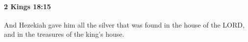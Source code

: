
		\paragraph{2 Kings 18:15} %
			\label{2KINGS-18-15}

			And Hezekiah gave him all the silver that was found in the house of the LORD, and in the treasures of the king’s house.


